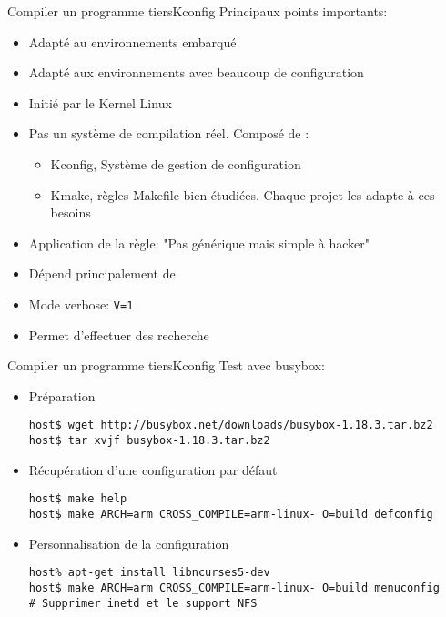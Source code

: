 \begin{frame}[fragile=singleslide]{Compiler un programme tiers}{Kconfig}
  Principaux points importants:
  \begin{itemize}
  \item Adapté au environnements embarqué
  \item Adapté aux environnements avec beaucoup de configuration
  \item Initié par le Kernel Linux
  \item  Pas un  système de  compilation réel. Composé de :
    \begin{itemize}
    \item Kconfig, Système de gestion de configuration
    \item  Kmake, règles  Makefile  bien étudiées.  Chaque projet  les
      adapte à ces besoins
    \end{itemize}
  \item Application de la règle: "Pas générique mais simple à hacker"
  \item Dépend principalement de 
  \item Mode verbose: \verb+V=1+
  \item Permet d'effectuer des recherche
  \end{itemize}
\end{frame}

\begin{frame}[fragile=singleslide]{Compiler un programme tiers}{Kconfig}
  Test avec busybox:
  \begin{itemize}
  \item Préparation
\begin{lstlisting}
host$ wget http://busybox.net/downloads/busybox-1.18.3.tar.bz2
host$ tar xvjf busybox-1.18.3.tar.bz2
\end{lstlisting} %
  \item Récupération d'une configuration par défaut
\begin{lstlisting}
host$ make help
host$ make ARCH=arm CROSS_COMPILE=arm-linux- O=build defconfig
\end{lstlisting} %
  \item Personnalisation de la configuration
\begin{lstlisting}
host% apt-get install libncurses5-dev
host$ make ARCH=arm CROSS_COMPILE=arm-linux- O=build menuconfig
# Supprimer inetd et le support NFS
\end{lstlisting} %
  \end{itemize}
\end{frame}

